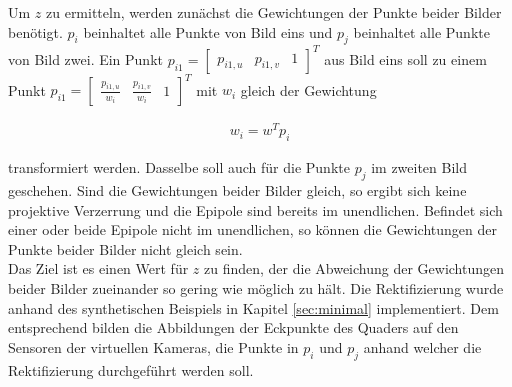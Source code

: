 
%
%

Um $z$ zu ermitteln, werden zunächst die Gewichtungen der Punkte beider Bilder benötigt. $p_i$ beinhaltet alle Punkte von Bild eins und $p_j$ beinhaltet alle Punkte von Bild zwei. Ein Punkt  $p_{i1} = \begin{bmatrix}p_{i1,u}&p_{i1,v}&1\end{bmatrix}^T$ aus Bild eins soll zu einem Punkt $p_{i1} = \begin{bmatrix}\frac{p_{i1,u}}{w_i}&\frac{p_{i1,v}}{w_i}&1\end{bmatrix}^T$ mit $w_i$ gleich der Gewichtung 

\begin{gather}
	w_i=w^Tp_i
\end{gather} 

transformiert werden. Dasselbe soll auch für die Punkte $p_j$ im zweiten Bild geschehen. Sind die Gewichtungen beider Bilder gleich, so ergibt sich keine projektive Verzerrung und die Epipole sind bereits im unendlichen. Befindet sich einer oder beide Epipole nicht im unendlichen, so können die Gewichtungen der Punkte beider Bilder nicht gleich sein\cite{ZZ}.\\

Das Ziel ist es einen Wert für $z$ zu finden, der die Abweichung der Gewichtungen beider Bilder zueinander so gering wie möglich zu hält. Die Rektifizierung wurde anhand des synthetischen Beispiels in Kapitel \ref{sec:minimal} implementiert. Dem entsprechend bilden die Abbildungen der Eckpunkte des Quaders auf den Sensoren der virtuellen Kameras, die Punkte in $p_i$ und $p_j$ anhand welcher die Rektifizierung durchgeführt werden soll. \\

